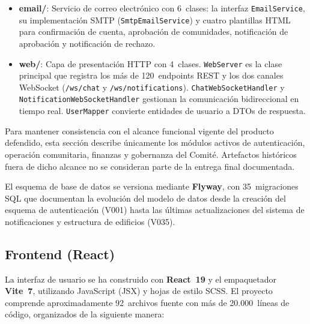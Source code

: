 \begin{itemize}
    \item \textbf{email/}: Servicio de correo electrónico con 6~clases: la interfaz \texttt{EmailService}, su implementación SMTP (\texttt{SmtpEmailService}) y cuatro plantillas HTML para confirmación de cuenta, aprobación de comunidades, notificación de aprobación y notificación de rechazo.

    \item \textbf{web/}: Capa de presentación HTTP con 4~clases. \texttt{WebServer} es la clase principal que registra los más de 120~endpoints REST y los dos canales WebSocket (\texttt{/ws/chat} y \texttt{/ws/notifications}). \texttt{ChatWebSocketHandler} y \texttt{NotificationWebSocketHandler} gestionan la comunicación bidireccional en tiempo real. \texttt{UserMapper} convierte entidades de usuario a DTOs de respuesta.
\end{itemize}

Para mantener consistencia con el alcance funcional vigente del producto defendido, esta sección describe únicamente los módulos activos de autenticación, operación comunitaria, finanzas y gobernanza del Comité. Artefactos históricos fuera de dicho alcance no se consideran parte de la entrega final documentada.

El esquema de base de datos se versiona mediante \textbf{Flyway}, con 35~migraciones SQL que documentan la evolución del modelo de datos desde la creación del esquema de autenticación (V001) hasta las últimas actualizaciones del sistema de notificaciones y estructura de edificios (V035).

\subsection{Frontend (React)}
La interfaz de usuario se ha construido con \textbf{React~19} y el empaquetador \textbf{Vite~7}, utilizando JavaScript (JSX) y hojas de estilo SCSS. El proyecto comprende aproximadamente 92~archivos fuente con más de 20.000~líneas de código, organizados de la siguiente manera:

